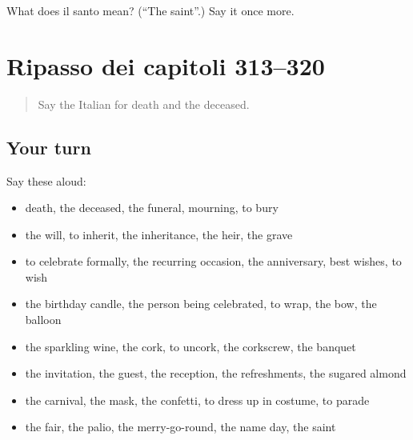 \begin{tcolorbox}[breakable,colback=teal!4,colframe=teal!35!black,title={Before you move on}]
What does il santo mean? (\textquotedblleft{}The saint\textquotedblright{}.) Say it once more.
\end{tcolorbox}
\section[(dialogue)]{Ripasso dei capitoli 313–320}

\label{lesson:IT-R320-ripasso-313-320}



\begin{quote}
Say the Italian for death and the deceased.
\end{quote}

\subsection*{Your turn}
Say these aloud:

\begin{itemize}
\raggedright
  \item death, the deceased, the funeral, mourning, to bury
  \item the will, to inherit, the inheritance, the heir, the grave
  \item to celebrate formally, the recurring occasion, the anniversary, best wishes, to wish
  \item the birthday candle, the person being celebrated, to wrap, the bow, the balloon
  \item the sparkling wine, the cork, to uncork, the corkscrew, the banquet
  \item the invitation, the guest, the reception, the refreshments, the sugared almond
  \item the carnival, the mask, the confetti, to dress up in costume, to parade
  \item the fair, the palio, the merry-go-round, the name day, the saint
\end{itemize}

